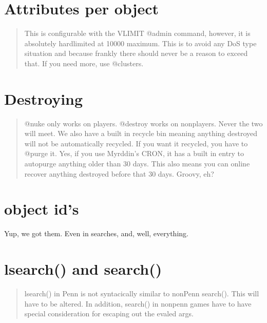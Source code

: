 \documentclass[letterpaper,10pt,english]{sphinxmanual}
\begin{document}
\section{Attributes per object}
\label{\detokenize{10-customize:attributes-per-object}}\begin{quote}

\sphinxAtStartPar
This is configurable with the VLIMIT @admin
command, however, it is absolutely hard\sphinxhyphen{}limited at 10000 maximum.
This is to avoid any DoS type situation and because frankly there
should never be a reason to exceed that.  If you need more, use
@clusters.
\end{quote}


\section{Destroying}
\label{\detokenize{10-customize:destroying}}\begin{quote}

\sphinxAtStartPar
@nuke only works on players.  @destroy works on non\sphinxhyphen{}players.
Never the two will meet.  We also have a built in recycle bin meaning
anything destroyed will not be automatically recycled.  If you want it
recycled, you have to @purge it.  Yes, if you use  Myrddin’s CRON, it
has a built in entry to auto\sphinxhyphen{}purge anything older than 30 days.  This
also means you can on\sphinxhyphen{}line recover anything destroyed before that 30
days.  Groovy, eh?
\end{quote}


\section{object id’s}
\label{\detokenize{10-customize:object-id-s}}
\sphinxAtStartPar
Yup, we got them.  Even in searches, and, well, everything.


\section{lsearch() and search()}
\label{\detokenize{10-customize:lsearch-and-search}}\begin{quote}

\sphinxAtStartPar
lsearch() in Penn is not syntacically similar to non\sphinxhyphen{}Penn search().
This will have to be altered.  In addition, search() in non\sphinxhyphen{}penn games
have to have special consideration for escaping out the evaled args.
\end{quote}
\end{document}
